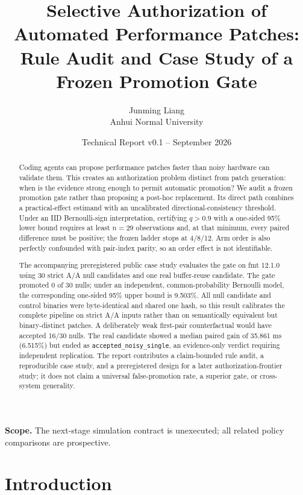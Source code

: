 \documentclass[10pt]{article}
\title{Selective Authorization of Automated Performance Patches:\\
Rule Audit and Case Study of a Frozen Promotion Gate}
\author{Junming Liang\\Anhui Normal University}
\date{Technical Report v0.1 -- September 2026}
\newcommand{\NullCount}{30}
\newcommand{\NullPromotions}{0}
\newcommand{\NullUpperBound}{9.503\%}
\newcommand{\NaiveNull}{16/30}
\newcommand{\RealGainMs}{35.861}
\newcommand{\RealGainPct}{6.515\%}
\newcommand{\QMinimumN}{29}
\begin{document}
\maketitle

\begin{abstract}
Coding agents can propose performance patches faster than noisy hardware can
validate them.  This creates an authorization problem distinct from patch
generation: when is the evidence strong enough to permit automatic promotion?
We audit a frozen promotion gate rather than proposing a post-hoc replacement.
Its direct path combines a practical-effect estimand with an uncalibrated
directional-consistency threshold.  Under an IID Bernoulli-sign interpretation,
certifying $q>0.9$ with a one-sided 95\% lower bound requires at least
$n=\QMinimumN$ observations and, at that minimum, every paired difference must
be positive; the frozen ladder stops at 4/8/12.  Arm order is also perfectly
confounded with pair-index parity, so an order effect is not identifiable.

The accompanying preregistered public case study evaluates the gate on fmt
12.1.0 using 30 strict A/A null candidates and one real buffer-reuse candidate.
The gate promoted \NullPromotions{} of \NullCount{} nulls; under an independent,
common-probability Bernoulli model, the corresponding one-sided 95\% upper bound
is \NullUpperBound{}.  All null candidate and control binaries were
byte-identical and shared one hash, so this result calibrates the complete
pipeline on strict A/A inputs rather than on semantically equivalent but
binary-distinct patches.  A deliberately weak first-pair counterfactual would
have accepted \NaiveNull{} nulls.  The real candidate showed a median paired
gain of \RealGainMs{} ms (\RealGainPct{}) but ended as
\texttt{accepted\_noisy\_single}, an evidence-only verdict requiring
independent replication.  The report contributes a claim-bounded rule audit,
a reproducible case study, and a preregistered design for a later
authorization-frontier study; it does not claim a universal false-promotion
rate, a superior gate, or cross-system generality.
\end{abstract}

\noindent\textbf{Scope.} The next-stage simulation contract is unexecuted; all
related policy comparisons are prospective.

\section{Introduction}
\end{document}
